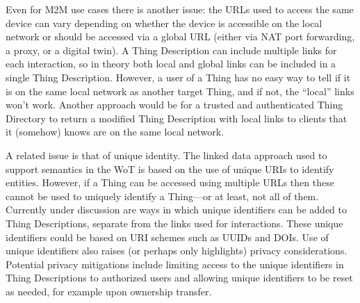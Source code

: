 Even for M2M use cases there is another issue: the URLs
used to access the same device can vary depending on whether the
device is accessible on the local network or should be accessed
via a global URL (either via NAT port forwarding, a proxy, or
a digital twin).
A Thing Description can include multiple links
for each interaction,
so in theory both local and global links
can be included in a single Thing Description.
However,
a user of a Thing has no easy way to tell if it is on
the same local network as another target Thing,
and if not, the ``local'' links won't work.
Another
approach would be for a trusted and authenticated
Thing Directory to return a modified
Thing Description with local links to clients that it (somehow) knows 
are on the same local network.

A related issue is that of unique identity.
The linked data approach used to support semantics in the WoT
is based on the use of unique URIs to identify entities.
However, if a Thing can be accessed using multiple URLs then
these cannot be used to uniquely identify a Thing---or at least, not all of them. 
Currently under discussion are ways in
which unique identifiers can be added to Thing Descriptions,
separate from the links used for interactions.
These unique identifiers could be based on URI schemes such as UUIDs and DOIs.
Use of unique identifiers also raises (or perhaps only highlights) privacy considerations.
Potential privacy mitigations include limiting access to the unique identifiers in
Thing Descriptions to authorized users and
allowing unique identifiers to be reset as needed,
for example upon ownership transfer.
